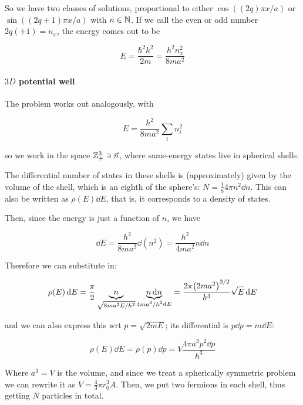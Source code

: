 \documentclass{article}
\begin{document}
So we have two classes of solutions, proportional to either \(\cos((2q)\pi x/a)\) or \(\sin((2q+1)\pi x/a)\) with \(n
\in \mathbb{N}\). If we call the even or odd number \(2q (+1) = n_x\), the energy comes out to be

\begin{equation}
    E = \frac{\hbar^2 k^2}{2m} = \frac{h^2 n_x^2}{8ma^2}
\end{equation}

\paragraph{\(3D\) potential well}

The problem works out analogously, with

\begin{equation}
    E = \frac{h^2}{8ma^2} \sum _i  n_i^2
\end{equation}

so we work in the space \(\mathbb{Z}_+^3 \ni \vec{n} \), where same-energy states live in spherical shells.

The differential number of states in these shells is (approximately) given by the volume of the shell, which is an eighth of the sphere's: \(N = \frac{1}{8} 4 \pi n^2 \dd{n} \). This can also be written as \(\rho(E) \dd{E} \), that is, it corresponds to a density of states.

Then, since the energy is just a function of \(n\), we have

\begin{equation}
    \dd{E} = \frac{h^2}{8ma^2} \dd{(n^2)} =   \frac{h^2}{4ma^2} n\dd{n}
\end{equation}

Therefore we can substitute in:

\begin{equation}
    \rho(E) \dd{E} = \frac{\pi}{2} \underbrace{n}_{\substack{\sqrt{8ma^2 E/h^2}}} \underbrace{n \dd{n} }_{\substack{4ma^2 / h^2} \dd{E} } = \frac{2 \pi  \qty(2ma^2)^{3/2}}{h^3} \sqrt{E} \dd{E}
\end{equation}

and we can also express this wrt \(p = \sqrt{2mE} \); its differential is \(p\dd{p} = m \dd{E} \):

\begin{equation} \label{eq:fermi-model-momentum-density}
    \rho(E) \dd{E} = \rho(p) \dd{p} = V \frac{4 \pi a^3 p^2 \dd{p} }{h^3}
\end{equation}

Where \(a^3 = V\) is the volume, and since we treat a spherically symmetric problem we can rewrite it as \(V = \frac{4}{3}\pi r_0^3 A\). Then, we put two fermions in each shell, thus getting \(N\) particles in total.
\end{document}
